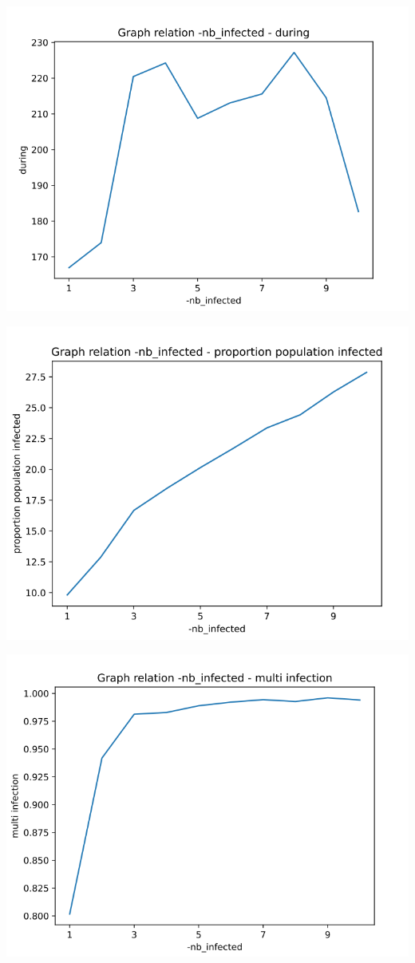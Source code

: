 \documentclass[a4paper, 11pt]{article}
\begin{document}
				
				\includegraphics[scale=0.45]{attachements/nb_infected_during.png}
				
				\includegraphics[scale=0.45]{attachements/nb_infected_proportion.png}
				
				\includegraphics[scale=0.45]{attachements/nb_infected_multi_infection.png}
				
\end{document}
